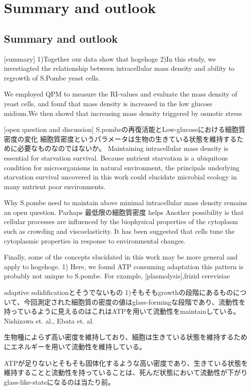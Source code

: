 \chapter{Summary and outlook}
\section{Summary and outlook}
[summary]
1)Together our data show that hogehoge
2)In this study, we investiagted the relationship between intracellular mass density and ability to regrowth of S.Pombe yeast cells.

We employed QPM to measure the RI-values and evaluate the mass density of yeast cells, and founf that mass density is increased in the low glucose midium.We then showd that increasing mass density triggered by osmotic stress 

[open question and discussion]
S.pombeの再復活能とLow-glucoseにおける細胞質密度の変化
細胞質密度というパラメータは生物の生きている状態を維持するために必要なものなのではないか。
Maintaining intracellular mass density is essential for starvation survival. Because nutrient starvation is a ubiquitous condition for microorganisms in natural environment, the principals underlying starvation survival uncovered in this work could elucidate microbial ecology in many nutrient poor environments. 

Why S.pombe need to maintain above minimal intracellular mass density remains an open question. 
Parhaps 最低限の細胞質密度 helps 
Another possibility is that cellular processes are influenced by the biophysical properties of the cytoplasm such as crowding and viscoelasticity. It has been suggested that cells tune the cytoplasmic properties in response to environmental changes.

Finally, some of the concepts elucidated in this work may be more general and apply to hogehoge.
1) Here, we found ATP consuming adaptation
this pattern is probably not unique to S.pombe. For example, [plasmolysis],frizid cerevisiae

adaptive solidificationとそうでないもの
1)そもそもgrowthの段階にあるものについて、今回測定された細胞質の密度の値はglass-formingな段階であり、流動性を持っているように見えるのはこれはATPを用いて流動性をmaintainしている。Nishizawa et. al., Ebata et. al.

生物種によらず高い密度を維持しており、細胞は生きている状態を維持するためにエネルギーを用いて流動性を維持している。

ATPが足りないとそもそも固体化するような高い密度であり、生きている状態を維持することと流動性を持っていることは、死んだ状態において流動性が下がりglass-like-stateになるのは当たり前。

